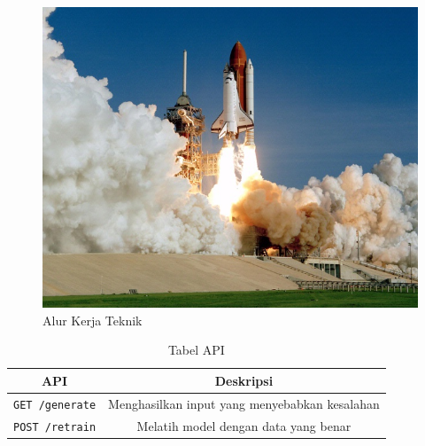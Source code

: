 \begin{figure}[H]
  \centering
  \includegraphics[scale=0.35]{gambar/roketluarangkasa.jpg}

  \caption{Alur Kerja Teknik}
  \label{fig:alur kerja teknik}
\end{figure}

\begin{table}[H]
  \centering
  \caption{Tabel API}
  \begin{tabular}{|c|c|}
    \hline
    \textbf{API} & \textbf{Deskripsi} \\
    \hline
    \texttt{GET /generate} & Menghasilkan input yang menyebabkan kesalahan \\
    \hline
    \texttt{POST /retrain} & Melatih model dengan data yang benar \\
    \hline
  \end{tabular}
  \label{tab:api}
\end{table}

